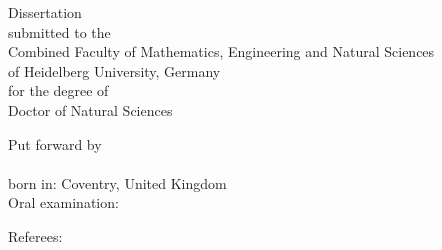 %




\begin{titlepage}
	\centering
	\begin{large}
		Dissertation\\[5mm]
		submitted to the\\
		Combined Faculty of Mathematics, Engineering and Natural Sciences\\
		of Heidelberg University, Germany\\
		for the degree of\\[5mm]
		Doctor of Natural Sciences\\

		\hfill
		\vfill

		Put forward by\\[5mm]
		\thesisName\\
		born in: Coventry, United Kingdom\\[5mm]
		Oral examination: \thesisExamDate\\
	\end{large}
\end{titlepage}

\begin{titlepage}
	\centering
	{\Large \thesisTitle}
	\hfill
	\vfill

	\begin{minipage}[t]{.3\textwidth}
		\raggedleft
		Referees:
	\end{minipage}
	\hspace*{.1\textwidth}
	\begin{minipage}[t]{.585\textwidth}
		{\thesisFirstReviewer} \\
		{\thesisSecondReviewer} \\
	\end{minipage} \\[5mm]

	\newpage
\end{titlepage}


